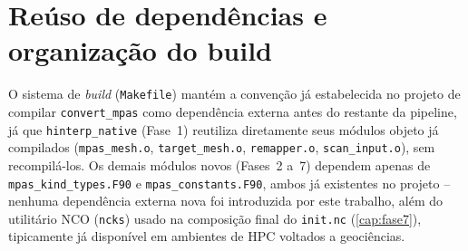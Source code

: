 \section{Reúso de dependências e organização do build}

O sistema de \textit{build} (\texttt{Makefile}) mantém a convenção já
estabelecida no projeto \selfgrib{} de compilar \texttt{convert\_mpas}
como dependência externa antes do restante da pipeline, já que
\texttt{hinterp\_native} (Fase~1) reutiliza diretamente seus módulos
objeto já compilados (\texttt{mpas\_mesh.o}, \texttt{target\_mesh.o},
\texttt{remapper.o}, \texttt{scan\_input.o}), sem recompilá-los. Os
demais módulos novos (Fases~2 a~7) dependem apenas de
\texttt{mpas\_kind\_types.F90} e \texttt{mpas\_constants.F90}, ambos já
existentes no projeto -- nenhuma dependência externa nova foi introduzida
por este trabalho, além do utilitário NCO (\texttt{ncks}) usado na
composição final do \texttt{init.nc} (\cref{cap:fase7}), tipicamente já
disponível em ambientes de HPC voltados a geociências.
